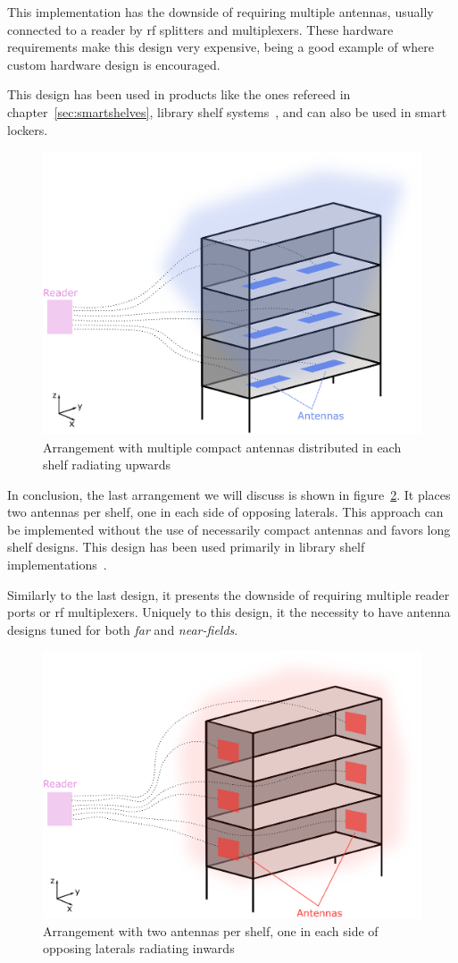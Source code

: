 This implementation has the downside of requiring multiple antennas, usually connected to a reader by \ac{rf} splitters and multiplexers.
These hardware requirements make this design very expensive, being a good example of where custom hardware design is encouraged.

This design has been used in products like the ones refereed in chapter~\ref{sec:smartshelves}, library shelf systems~\cite{markakisSafeEfficientDesign2014}, and can also be used in smart lockers.

\begin{figure}[H]
    \centering
    \includegraphics[width=0.7\linewidth]{./figs/02-state-of-the-art/position2_1.eps}
    \caption{Arrangement with multiple compact antennas distributed in each shelf radiating upwards} 
    \label{fig:position2}
\end{figure}

In conclusion, the last arrangement we will discuss is shown in figure~\ref{fig:position3}. It places two antennas per shelf, one in each side of opposing laterals. This approach can be implemented without the use of necessarily compact antennas and favors long shelf designs.
This design has been used primarily in library shelf implementations~\cite{markakisRFIDenabledLibraryManagement2013}.

Similarly to the last design, it presents the downside of requiring multiple reader ports or \ac{rf} multiplexers. Uniquely to this design, it the necessity to have antenna designs tuned for both \emph{far} and \emph{near-fields}.

\begin{figure}[H]
    \centering
    \includegraphics[width=0.7\linewidth]{./figs/02-state-of-the-art/position3.eps}
    \caption{Arrangement with two antennas per shelf, one in each side of opposing laterals radiating inwards} 
    \label{fig:position3}
\end{figure}

